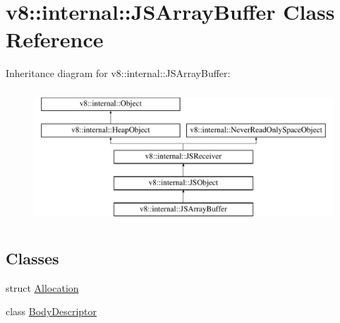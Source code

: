 \hypertarget{classv8_1_1internal_1_1JSArrayBuffer}{}\section{v8\+:\+:internal\+:\+:J\+S\+Array\+Buffer Class Reference}
\label{classv8_1_1internal_1_1JSArrayBuffer}
Inheritance diagram for v8\+:\+:internal\+:\+:J\+S\+Array\+Buffer\+:\begin{figure}[H]
\begin{center}
\leavevmode
\includegraphics[height=5.000000cm]{classv8_1_1internal_1_1JSArrayBuffer}
\end{center}
\end{figure}
\subsection*{Classes}
\begin{DoxyCompactItemize}
\item 
struct \mbox{\hyperlink{structv8_1_1internal_1_1JSArrayBuffer_1_1Allocation}{Allocation}}
\item 
class \mbox{\hyperlink{classv8_1_1internal_1_1JSArrayBuffer_1_1BodyDescriptor}{Body\+Descriptor}}
\end{DoxyCompactItemize}
